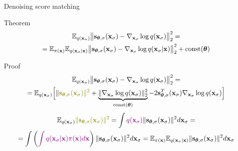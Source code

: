 \begin{frame}{Denoising score matching}
	\begin{block}{Theorem}
	\vspace{-0.5cm}
	\begin{multline*}
		\mathbb{E}_{q(\mathbf{x}_{\sigma})}\bigl\| \mathbf{s}_{\boldsymbol{\theta}, \sigma}(\mathbf{x}_{\sigma}) - \nabla_{\mathbf{x}_{\sigma}} \log q(\mathbf{x}_{\sigma}) \bigr\|^2_2 = \\
		= \mathbb{E}_{\pi(\mathbf{x})} \mathbb{E}_{q(\mathbf{x}_{\sigma} | \mathbf{x})}\bigl\| \mathbf{s}_{\boldsymbol{\theta}, \sigma}(\mathbf{x}_{\sigma}) - \nabla_{\mathbf{x}_{\sigma}} \log q(\mathbf{x}_{\sigma} | \mathbf{x}) \bigr\|^2_2 + \text{const}(\boldsymbol{\theta})
	\end{multline*}
	\vspace{-0.5cm}
	\end{block}
	\begin{block}{Proof}
		\vspace{-0.7cm}
		{\small
		\begin{multline*}
			\bbE_{q(\bx_{\sigma})}\bigl\| \bs_{\btheta, \sigma}(\bx_{\sigma}) - \nabla_{\bx_{\sigma}} \log q(\bx_{\sigma}) \bigr\|^2_2 = \\ 
			= \bbE_{q(\bx_{\sigma})} \Bigl[\| {\color{olive}\bs_{\btheta, \sigma}(\bx_{\sigma}) \|^2} + \underbrace{\| \nabla_{\bx_{\sigma}} \log q(\bx_{\sigma}) \|^2_2}_{\text{const}(\btheta)} - 2 \bs_{\btheta, \sigma}^T(\bx_{\sigma}) \nabla_{\bx_{\sigma}} \log q(\bx_{\sigma}) \Bigr]
		\end{multline*}
		\vspace{-0.7cm}
		\begin{multline*}
			\bbE_{q(\bx_{\sigma})} {\color{olive} \| \bs_{\btheta, \sigma}(\bx_{\sigma}) \|^2} = \int {\color{violet}q(\bx_{\sigma})} \| \bs_{\btheta, \sigma}(\bx_{\sigma}) \|^2 d\bx_{\sigma} = \\
			= \int \left({\color{violet}\int q(\bx_{\sigma} | \bx) \pi(\bx) d\bx}\right) \| \bs_{\btheta, \sigma}(\bx_{\sigma}) \|^2 d\bx_{\sigma} =  \bbE_{\pi(\bx)} \bbE_{q(\bx_{\sigma} | \bx)}  \| \bs_{\btheta, \sigma}(\bx_{\sigma}) \|^2 d\bx_{\sigma}
		\end{multline*}
		}
	\end{block}
\end{frame}
